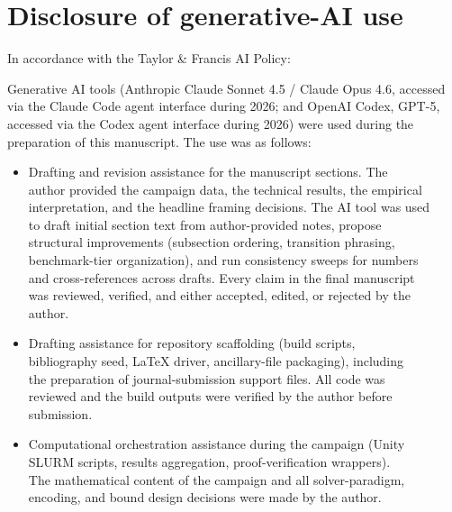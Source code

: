 \documentclass[
]{article}
\begin{document}
\section{Disclosure of generative-AI
use}\label{disclosure-of-generative-ai-use}

In accordance with the Taylor \& Francis AI Policy:

Generative AI tools (Anthropic Claude Sonnet 4.5 / Claude Opus 4.6,
accessed\\
via the Claude Code agent interface during 2026; and OpenAI Codex,
GPT-5,\\
accessed via the Codex agent interface during 2026) were used during
the\\
preparation of this manuscript. The use was as follows:

\begin{itemize}
\item
  Drafting and revision assistance for the manuscript sections. The\\
  author provided the campaign data, the technical results, the
  empirical\\
  interpretation, and the headline framing decisions. The AI tool was
  used\\
  to draft initial section text from author-provided notes, propose\\
  structural improvements (subsection ordering, transition phrasing,\\
  benchmark-tier organization), and run consistency sweeps for numbers\\
  and cross-references across drafts. Every claim in the final
  manuscript\\
  was reviewed, verified, and either accepted, edited, or rejected by
  the\\
  author.
\item
  Drafting assistance for repository scaffolding (build scripts,\\
  bibliography seed, LaTeX driver, ancillary-file packaging),
  including\\
  the preparation of journal-submission support files. All code was\\
  reviewed and the build outputs were verified by the author before\\
  submission.
\item
  Computational orchestration assistance during the campaign (Unity\\
  SLURM scripts, results aggregation, proof-verification wrappers).\\
  The mathematical content of the campaign and all solver-paradigm,\\
  encoding, and bound design decisions were made by the author.
\end{itemize}
\end{document}
